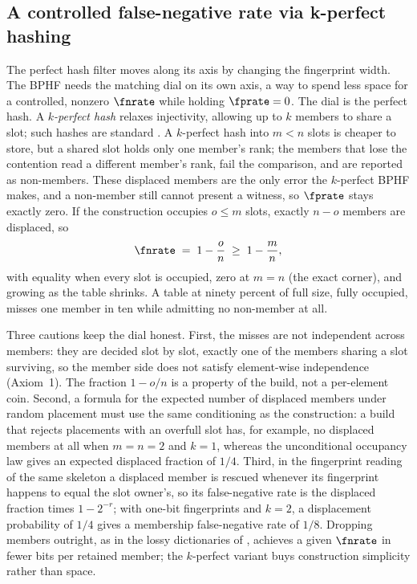 \subsection*{A controlled false-negative rate via k-perfect hashing}

The perfect hash filter moves along its axis by changing the fingerprint
width. The BPHF needs the matching dial on its own axis, a way to spend
less space for a controlled, nonzero $\fnrate$ while holding $\fprate =
0$. The dial is the perfect hash. A \emph{$k$-perfect
hash} relaxes injectivity,
allowing up to $k$ members to share a slot; such hashes are standard
\parencite{belazzougui-2009}. A $k$-perfect hash into $m < n$ slots is
cheaper to store, but a shared slot holds only one member's rank; the
members that lose the contention read a different member's rank, fail
the comparison, and are reported as non-members. These displaced members
are the only error the $k$-perfect BPHF makes, and a non-member still
cannot present a witness, so $\fprate$ stays exactly zero. If the
construction occupies $o \le m$ slots, exactly $n - o$ members are
displaced, so
\begin{equation}
\label{eq:bphf-fnr}
  \fnrate \;=\; 1 - \frac{o}{n} \;\ge\; 1 - \frac{m}{n},
\end{equation}
with equality when every slot is occupied, zero at $m = n$ (the exact
corner), and growing as the table shrinks. A table at ninety percent of
full size, fully occupied, misses one member in ten while admitting no
non-member at all.

Three cautions keep the dial honest. First, the misses are not
independent across members: they are decided slot by slot, exactly one
of the members sharing a slot surviving, so the member side does not
satisfy element-wise independence (Axiom~1). The fraction $1 - o/n$ is a
property of the build, not a per-element coin. Second, a formula for the
expected number of displaced members under random placement must use the
same conditioning as the construction: a build that rejects placements
with an overfull slot has, for example, no displaced members at all when
$m = n = 2$ and $k = 1$, whereas the unconditional occupancy law gives
an expected displaced fraction of $1/4$. Third, in the fingerprint
reading of the same skeleton a displaced member is rescued whenever its
fingerprint happens to equal the slot owner's, so its false-negative rate
is the displaced fraction times $1 - 2^{-r}$; with one-bit fingerprints
and $k = 2$, a displacement probability of $1/4$ gives a membership
false-negative rate of $1/8$. Dropping members outright, as in the lossy
dictionaries of \textcite{pagh-rodler-2001}, achieves a given $\fnrate$ in
fewer bits per retained member; the $k$-perfect variant buys construction
simplicity rather than space.

